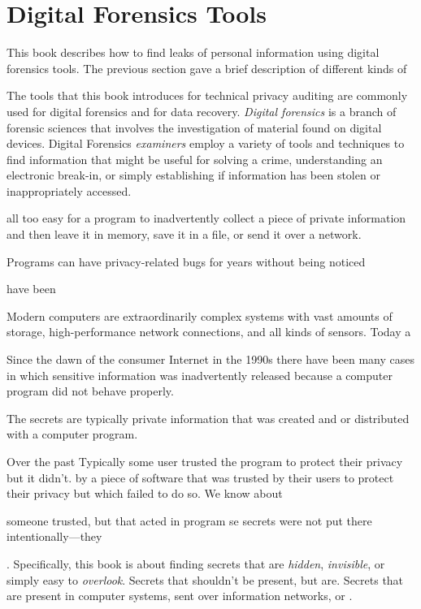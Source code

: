 \section{Digital Forensics Tools}

This book describes how to find leaks of personal information using
digital forensics tools. The previous section gave a brief description
of different kinds of 


The tools that this book introduces for technical privacy auditing are
commonly used for digital forensics and for data
  recovery. \emph{Digital forensics} is a branch of forensic sciences
  that involves the investigation of material found on digital
  devices. Digital Forensics \emph{examiners} employ a variety of
  tools and techniques to find information that might be useful for
  solving a crime, understanding an electronic break-in, or simply
  establishing if information has been stolen or inappropriately
  accessed. 


all too easy for a program to inadvertently collect a piece of private
information and then leave it in memory, save it in a file, or send it
over a network. 

Programs can have privacy-related bugs for years without being noticed 

have been 

Modern computers are extraordinarily complex systems with vast amounts
of storage, high-performance network connections, and all kinds of
sensors. Today a 

Since the dawn of the consumer Internet in the 1990s there have been
many cases in which sensitive information was inadvertently released
because a computer program did not behave properly. 

The secrets are typically
private information that was created and or distributed with a
computer program. 


Over the past 
Typically some user trusted the program to protect
their privacy but it didn't. by a piece
of software that was trusted by their users to protect their privacy
but which failed to do so. We know about 

someone trusted, but that acted in program se secrets were not put
there intentionally---they 

. Specifically, this book is about
finding secrets that are \emph{hidden}, \emph{invisible}, or simply
easy to \emph{overlook}. Secrets that shouldn't be present, but
are. Secrets that are present in computer systems, sent over
information networks, or .

